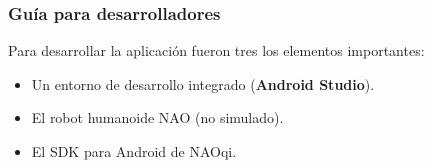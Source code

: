 





\subsubsection{Guía para desarrolladores}
\label{\detokenize{dev_docs::doc}}\label{\detokenize{dev_docs:guia-para-desarrolladores}}

Para desarrollar la aplicación fueron tres los elementos importantes:
\begin{itemize}
\item {} 
Un entorno de desarrollo integrado (\textbf{Android Studio}).

\item {} 
El robot humanoide NAO (no simulado).

\item {} 
El SDK para Android de NAOqi.

\end{itemize}

